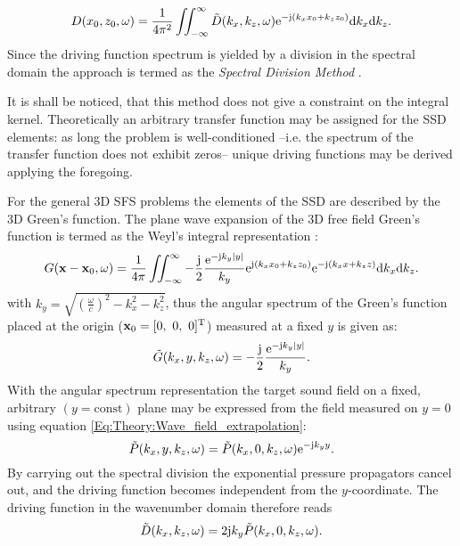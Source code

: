 \begin{equation}
D(x_0,z_0,\omega) = \frac{1}{4\pi^2} \iint_{-\infty}^{\infty} \tilde{D}(k_x,k_z, \omega) \mathrm{e}^{-\mathrm{j} (k_x x_0 + k_z z_0)} \mathrm{d} k_x \mathrm{d} k_z.
\label{Eq:Theory:Dkx_inverse_Fourier}
\end{equation}
Since the driving function spectrum is yielded by a division in the spectral domain the approach is termed as the \emph{Spectral Division Method} \cite{Ahrens2010a, Ahrens2012:Ambisonics_for_planar_linear, Ahrens2011:icassp, Ahrens2010:Ambisonics_w_planar_linear}.

It is shall be noticed, that this method does not give a constraint on the integral kernel. Theoretically an arbitrary transfer function may be assigned for the SSD elements: as long the problem is well-conditioned --i.e. the spectrum of the transfer function does not exhibit zeros-- unique driving functions may be derived applying the foregoing.

\vspace{3mm}
For the general 3D SFS problems the elements of the SSD are described by the 3D Green's function. The plane wave expansion of the 3D free field Green's function is termed as the Weyl's integral representation \cite{Williams1999, Lalor1969}:
\begin{equation}
G(\mathbf{x} - \mathbf{x}_0,\omega ) = \frac{1}{4\pi} \iint_{-\infty}^{\infty} -\frac{\mathrm{j}}{2}\frac{\mathrm{e}^{ -\mathrm{j} k_y  | y |  }}{ k_y }
\mathrm{e}^{\mathrm{j} (k_x x_0 + k_z z_0)} \mathrm{e}^{-\mathrm{j} (k_x x + k_z z)} \mathrm{d} k_x \mathrm{d} k_z.
\label{Eq:Theory:Weyls_integra}
\end{equation}
with $k_y = \sqrt{ \left( \frac{\omega}{c} \right )^2 - k_x^2 - k_z^2 }$, thus the angular spectrum of the Green's function placed at the origin ($\mathbf{x}_0 = [0,\ 0,\ 0]^{\mathrm{T}}$) measured at a fixed $y$ is given as:
\begin{equation}
\tilde{G}(k_x,y,k_z,\omega) =-\frac{\mathrm{j}}{2}\frac{\mathrm{e}^{ -\mathrm{j} k_y  | y |  }}{ k_y }.
\end{equation}
With the angular spectrum representation the target sound field on a fixed, arbitrary $(y=\mathrm{const})$ plane may be expressed from the field measured on $y=0$ using equation \eqref{Eq:Theory:Wave_field_extrapolation}:
\begin{equation}
\tilde{P}(k_x,y,k_z,\omega) = \tilde{P}(k_x,0,k_z,\omega) \mathrm{e}^{- \mathrm{j} k_y y}.
\label{Eq:Theory:Wave_field_extrapolation_2}
\end{equation}
By carrying out the spectral division the exponential pressure propagators cancel out, and the driving function becomes independent from the $y$-coordinate. The driving function in the wavenumber domain therefore reads
\begin{equation}
\tilde{D}(k_x,k_z,\omega) = 2\mathrm{j} k_y \tilde{P}(k_x,0,k_z,\omega).
\label{Eq:Theory:Planar_explicit_driv_fun}
\end{equation}

